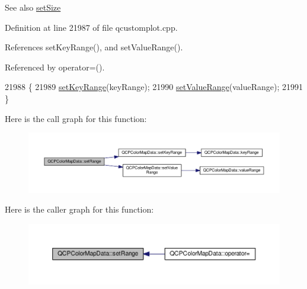 \begin{DoxySeeAlso}{See also}
\hyperlink{class_q_c_p_color_map_data_a0d9ff35c299d0478b682bfbcdd9c097e}{set\+Size} 
\end{DoxySeeAlso}


Definition at line 21987 of file qcustomplot.\+cpp.



References set\+Key\+Range(), and set\+Value\+Range().



Referenced by operator=().


\begin{DoxyCode}
21988                                                            \{
21989   \hyperlink{class_q_c_p_color_map_data_a0738c485f3c9df9ea1241b7a8bb6a86e}{setKeyRange}(keyRange);
21990   \hyperlink{class_q_c_p_color_map_data_ada1b2680ba96a5f4175b6d341cf75d23}{setValueRange}(valueRange);
21991 \}
\end{DoxyCode}


Here is the call graph for this function\+:\nopagebreak
\begin{figure}[H]
\begin{center}
\leavevmode
\includegraphics[width=350pt]{class_q_c_p_color_map_data_aad9c1c7c703c1339489fc730517c83d4_cgraph}
\end{center}
\end{figure}




Here is the caller graph for this function\+:\nopagebreak
\begin{figure}[H]
\begin{center}
\leavevmode
\includegraphics[width=350pt]{class_q_c_p_color_map_data_aad9c1c7c703c1339489fc730517c83d4_icgraph}
\end{center}
\end{figure}


